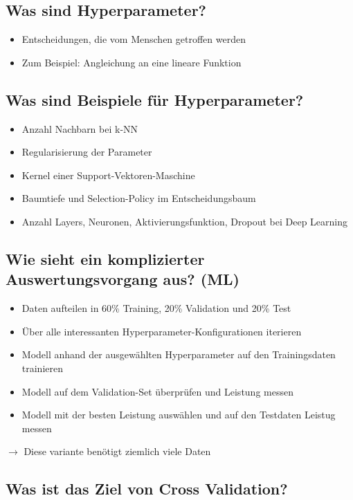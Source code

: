 \documentclass[a4paper]{article}
\begin{document}
		\subsection{Was sind Hyperparameter?}
		
		\begin{itemize}
			\item Entscheidungen, die vom Menschen getroffen werden
			\item Zum Beispiel: Angleichung an eine lineare Funktion
		\end{itemize}
	
		\subsection{Was sind Beispiele für Hyperparameter?}
		
		\begin{itemize}
			\item Anzahl Nachbarn bei k-NN
			\item Regularisierung der Parameter
			\item Kernel einer Support-Vektoren-Maschine
			\item Baumtiefe und Selection-Policy im Entscheidungsbaum
			\item Anzahl Layers, Neuronen, Aktivierungsfunktion, Dropout bei Deep Learning
		\end{itemize}
	
		\subsection{Wie sieht ein komplizierter Auswertungsvorgang aus? (ML)}
		
		\begin{itemize}
			\item Daten aufteilen in 60\% Training, 20\% Validation und 20\% Test
			\item Über alle interessanten Hyperparameter-Konfigurationen iterieren
			\item Modell anhand der ausgewählten Hyperparameter auf den Trainingsdaten trainieren
			\item Modell auf dem Validation-Set überprüfen und Leistung messen
			\item Modell mit der besten Leistung auswählen und auf den Testdaten Leistug messen
		\end{itemize}
		$\rightarrow$ Diese variante benötigt ziemlich viele Daten
		
		\subsection{Was ist das Ziel von Cross Validation?}
		
\end{document}
